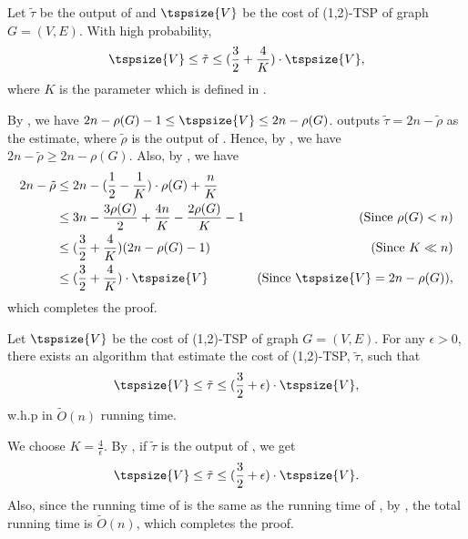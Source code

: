 \begin{lemma}\label{lem: 12tsp-approx}
Let $\tilde{\tau}$ be the output of  and $\tspsize{V}$ be the cost of (1,2)-TSP of graph $G = (V, E)$. With high probability,
$$
\tspsize{V} \leq \tilde{\tau} \leq (\frac{3}{2} + \frac{4}{K})\cdot \tspsize{V},
$$
where $K$ is the parameter which is defined in \algtwo{}.
\end{lemma}
\begin{myproof}
By , we have $2n - \rho(G) - 1 \leq \tspsize{V} \leq 2n - \rho(G)$.  outputs $\tilde{\tau} = 2n - \tilde{\rho}$ as the estimate, where $\tilde{\rho}$ is the output of . Hence, by , we have $2n - \tilde{\rho} \geq 2n - \rho(G)$. Also, by , we have 
\begin{align*}
    2n - \tilde{\rho} & \leq 2n - (\frac{1}{2} - \frac{1}{K})\cdot \rho(G) + \frac{n}{K} \\
    & \leq 3n - \frac{3\rho(G)}{2} + \frac{4n}{K} - \frac{2\rho(G)}{K} - 1 & (\text{Since } \rho(G) < n)\\
    & \leq (\frac{3}{2} + \frac{4}{K})(2n - \rho(G) - 1) & (\text{Since } K \ll n) \\
    & \leq (\frac{3}{2} + \frac{4}{K})\cdot\tspsize{V} & (\text{Since } \tspsize{V} = 2n - \rho(G)),\\
\end{align*}
which completes the proof.
\end{myproof}

\begin{theorem}\label{thm: 12tsp}
Let $\tspsize{V}$ be the cost of (1,2)-TSP of graph $G = (V, E)$. For any $\epsilon > 0$, there exists an algorithm that estimate the cost of (1,2)-TSP, $\tilde{\tau}$, such that
$$
\tspsize{V} \leq \tilde{\tau} \leq (\frac{3}{2} + \epsilon)\cdot \tspsize{V},
$$
w.h.p in $\tilde{O}(n)$ running time.
\end{theorem}
\begin{myproof}
We choose $K = \frac{4}{\epsilon}$. By , if $\tilde{\tau}$ is the output of , we get
\begin{align*}
    \tspsize{V} \leq \tilde{\tau} \leq (\frac{3}{2} + \epsilon)\cdot \tspsize{V}.
\end{align*}
Also, since the running time of  is the same as the running time of , by , the total running time is $\tilde{O}(n)$, which completes the proof.
\end{myproof}


